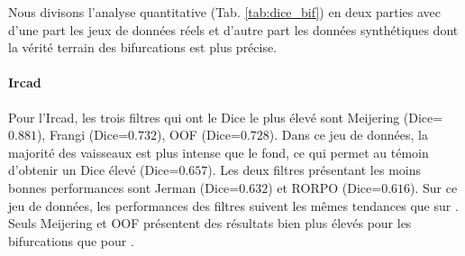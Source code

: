 \begin{table}[!ht]
  \caption{Résultats quantitatifs (moyenne $\pm$ écart-type) pour le masque des bifurcations \maskbif sur l'ensemble des jeux de données. Seul le Dice est exprimé car le MCC n'est pas défini sur ce masque.}
  \label{tab:dice_bif}
  \end{table}


Nous divisons l'analyse quantitative (Tab. \ref{tab:dice_bif}) en deux parties avec d'une part les jeux de données réels et d'autre part les données synthétiques dont la vérité terrain des bifurcations est plus précise.

\paragraph{Ircad}

Pour l'Ircad, les trois filtres qui ont le Dice le plus élevé sont Meijering (Dice=$0.881$), Frangi (Dice=$0.732$), OOF (Dice=$0.728$). Dans ce jeu de données, la majorité des vaisseaux est plus intense que le fond, ce qui permet au témoin d'obtenir un Dice élevé (Dice=$0.657$). Les deux filtres présentant les moins bonnes performances sont Jerman (Dice=$0.632$) et RORPO (Dice=$0.616$). Sur ce jeu de données, les performances des filtres suivent les mêmes tendances que sur \maskvascular. Seuls Meijering et OOF présentent des résultats bien plus élevés pour les bifurcations que pour \maskvascular.

